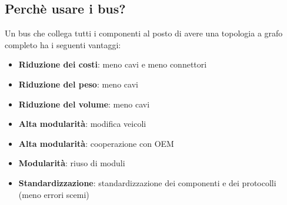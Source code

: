 \subsection{Perchè usare i bus?}
Un bus che collega tutti i componenti al posto di avere una topologia a grafo completo ha i seguenti vantaggi:
\begin{itemize}
  \item \textbf{Riduzione dei costi}: meno cavi e meno connettori
  \item \textbf{Riduzione del peso}: meno cavi
  \item \textbf{Riduzione del volume}: meno cavi
  \item \textbf{Alta modularità}: modifica veicoli
  \item \textbf{Alta modularità}: cooperazione con OEM
  \item \textbf{Modularità}: riuso di moduli
  \item \textbf{Standardizzazione}: standardizzazione dei componenti e dei protocolli (meno errori scemi)
\end{itemize}





